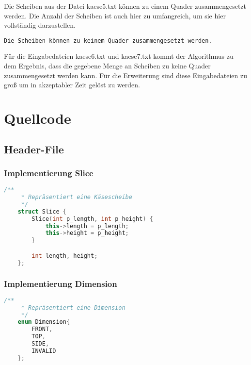 \documentclass[a4paper,10pt,ngerman]{scrartcl}
\begin{document}
    Die Scheiben aus der Datei kaese5.txt können zu einem Quader zusammengesetzt werden.
    Die Anzahl der Scheiben ist auch hier zu umfangreich, um sie hier vollständig darzustellen.

    \begin{lstlisting}[frame=single, title=Programmausgabe kaese6.txt / kaese7.txt, breaklines=true,label={lst:lstlisting11}]
    Die Scheiben können zu keinem Quader zusammengesetzt werden.
    \end{lstlisting}

    Für die Eingabedateien kaese6.txt und kaese7.txt kommt der Algorithmus zu dem Ergebnis,
    dass die gegebene Menge an Scheiben zu keine Quader zusammengesetzt werden kann.
    Für die Erweiterung sind diese Eingabedateien zu groß um in akzeptabler Zeit gelöst zu werden.

    \newpage
    \section{Quellcode}
    \label{sec:quellcode}
    \label{LastPage}

    \subsection{Header-File}\label{subsec:header-file}

    \subsubsection{Implementierung Slice}

    \begin{lstlisting}[frame=single,language=C++,title=Struct Slice,breaklines=true,label={lst:code_slice}]
    /**
     * Repräsentiert eine Käsescheibe
     */
    struct Slice {
        Slice(int p_length, int p_height) {
            this->length = p_length;
            this->height = p_height;
        }

        int length, height;
    };
    \end{lstlisting}

    \subsubsection{Implementierung Dimension}
    \begin{lstlisting}[frame=single,language=C++,title=Enum Dimension,breaklines=true,label={lst:code_dimension}]
    /**
     * Repräsentiert eine Dimension
     */
    enum Dimension{
        FRONT,
        TOP,
        SIDE,
        INVALID
    };
    \end{lstlisting}
\end{document}
